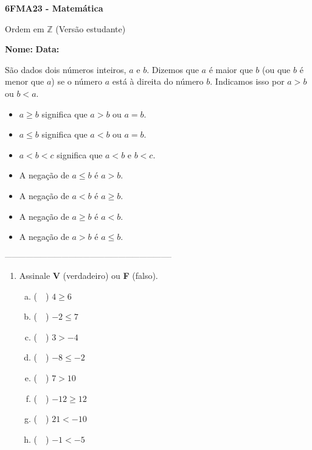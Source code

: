 \documentclass[a4paper,14pt]{article}
\begin{document}
	
	\noindent\textbf{6FMA23 - Matemática} 
	
	\begin{center}Ordem em $\mathbb{Z}$ (Versão estudante)
	\end{center}
	
	\noindent\textbf{Nome:} \underline{\hspace{10cm}}
	\noindent\textbf{Data:} \underline{\hspace{4cm}}
	
	
	\begin{multicols}{2}
		\noindent São dados dois números inteiros, $a$ e $b$. Dizemos que $a$ é maior que $b$ (ou que $b$ é menor que $a$) se o número $a$ está à direita do número $b$. Indicamos isso por $a > b$ ou $b < a$. \\
		\begin{itemize}
			\item $a \geq b$ significa que $a > b$ ou $a = b$.
			\item $a \leq b$ significa que $a < b$ ou $a = b$.
			\item $a < b < c$ significa que $a < b$ e $b < c$.
			\item A negação de $a \leq b$ é $a > b$.
			\item A negação de $a < b$ é $a \geq b$.
			\item A negação de $a \geq b$ é $a < b$.
			\item A negação de $a > b$ é $a \leq b$.
		\end{itemize}
		\noindent\textsubscript{-----------------------------------------------------------------------}
		\begin{enumerate} 
			\item Assinale \textbf{V} (verdadeiro) ou \textbf{F} (falso).
			\begin{enumerate}[a)]
				\item (~~) $4 \geq 6$
				\item (~~) $-2 \leq 7$
				\item (~~) $3 > -4$
				\item (~~) $-8 \leq -2$
				\item (~~) $7 > 10$
				\item (~~) $-12 \geq 12$
				\item (~~) $21 < -10$
				\item (~~) $-1 < -5$

\end{enumerate}
\end{enumerate}
\end{multicols}
\end{document}

